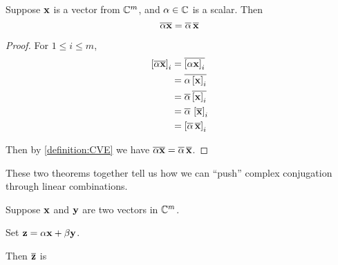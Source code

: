 \documentclass{ximera}
\begin{document}
\begin{theorem}
  \label{theorem:CRSM}
  
  Suppose $\mathbf{x}$ is a vector from $\mathbb{C}^{m}$, and $\alpha\in\mathbb{C}$ is a scalar.  Then
  \[
    \overline{\alpha\mathbf{x}}=\overline{\alpha}\,\overline{\mathbf{x}}
  \]
  
  \begin{proof}
    For $1\leq i\leq m$,
    \begin{align*}
      \vectorentry{\conjugate{\alpha\vect{x}}}{i}
      &=\conjugate{\vectorentry{\alpha\vect{x}}{i}}\\ %
      &=\conjugate{\alpha\vectorentry{\vect{x}}{i}}\\ %
      &=\conjugate{\alpha}\,\conjugate{\vectorentry{\vect{x}}{i}}\\ %
      &=\conjugate{\alpha}\,\vectorentry{\conjugate{\vect{x}}}{i}\\ %
      &=\vectorentry{\conjugate{\alpha}\,\conjugate{\vect{x}}}{i}\\ %
    \end{align*}

    Then by \ref{definition:CVE} we have $\overline{\alpha\mathbf{x}}=\overline{\alpha}\,\overline{\mathbf{x}}$.
\end{proof}
\end{theorem}

These two theorems together tell us how we can ``push'' complex conjugation through linear combinations.

\begin{example}
  Suppose $\mathbf{x}$ and $\mathbf{y}$ are two vectors in $\mathbb{C}^{m}$.
  
  Set $\mathbf{z} = \alpha \mathbf{x} + \beta \mathbf{y}$.

  Then $\overline{\mathbf{z}}$ is
  \begin{multipleChoice}
  \end{multipleChoice}
\end{example}
\end{document}
